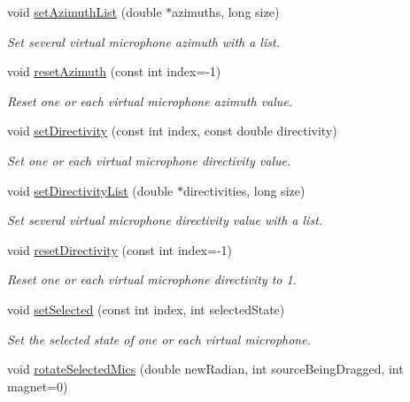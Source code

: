 \begin{DoxyCompactItemize}
void \hyperlink{class_hoa2_d_1_1_virtual_mic_manager_aeb7b3651b830d41628c0d48f94502a04}{set\-Azimuth\-List} (double $\ast$azimuths, long size)
\begin{DoxyCompactList}\small\item\em Set several virtual microphone azimuth with a list. \end{DoxyCompactList}\item 
void \hyperlink{class_hoa2_d_1_1_virtual_mic_manager_a1f0b6a97a6aebd1c0f93c0b2cd7d8653}{reset\-Azimuth} (const int index=-\/1)
\begin{DoxyCompactList}\small\item\em Reset one or each virtual microphone azimuth value. \end{DoxyCompactList}\item 
void \hyperlink{class_hoa2_d_1_1_virtual_mic_manager_ac0ebd1b76afc490cf767aa49bb7b27ba}{set\-Directivity} (const int index, const double directivity)
\begin{DoxyCompactList}\small\item\em Set one or each virtual microphone directivity value. \end{DoxyCompactList}\item 
void \hyperlink{class_hoa2_d_1_1_virtual_mic_manager_a3bc882e5ddddab304626a66078c6c8fe}{set\-Directivity\-List} (double $\ast$directivities, long size)
\begin{DoxyCompactList}\small\item\em Set several virtual microphone directivity value with a list. \end{DoxyCompactList}\item 
void \hyperlink{class_hoa2_d_1_1_virtual_mic_manager_ab37b1e4b1105a6246af9c67d1f7f3004}{reset\-Directivity} (const int index=-\/1)
\begin{DoxyCompactList}\small\item\em Reset one or each virtual microphone directivity to 1. \end{DoxyCompactList}\item 
void \hyperlink{class_hoa2_d_1_1_virtual_mic_manager_a06c95bbe7df88f3b21e7a82593a1a6aa}{set\-Selected} (const int index, int selected\-State)
\begin{DoxyCompactList}\small\item\em Set the selected state of one or each virtual microphone. \end{DoxyCompactList}\item 
void \hyperlink{class_hoa2_d_1_1_virtual_mic_manager_a7d03540e436756e59a26dd8747c47f8d}{rotate\-Selected\-Mics} (double new\-Radian, int source\-Being\-Dragged, int magnet=0)

\end{DoxyCompactItemize}
